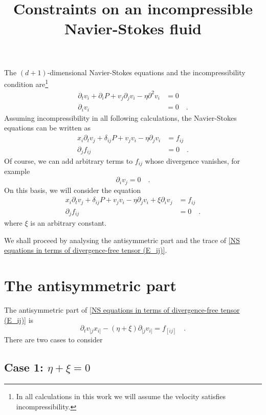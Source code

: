 \documentclass[10pt,a4paper]{article}
\title{Constraints on an incompressible Navier-Stokes fluid}
\date{}
\begin{document}
\maketitle

The $(d+1)$-dimensional Navier-Stokes equations and the incompressibility condition are\footnote{In all calculations in this work we will assume the velocity satisfies incompressibility.}
\begin{align}
	\partial_t v_i + \partial_i P + v_j\partial_j v_i - \eta \partial^2 v_i & = 0
\\	\partial_i v_i & = 0		\quad.
\end{align}
Assuming incompressibility in all following calculations, the Navier-Stokes equations can be written as
\begin{align}
	x_i \partial_t v_j + \delta_{ij} P + v_j v_i - \eta \partial_j v_i & = f_{ij}
\\	\partial_j f_{ij} & = 0\quad.
\end{align}
Of course, we can add arbitrary terms to $f_{ij}$ whose divergence vanishes, for example
\begin{equation}
	\partial_i v_j = 0		\quad.
\end{equation}
On this basis, we will consider the equation
\begin{align}
	x_i \partial_t v_j + \delta_{ij} P + v_j v_i - \eta \partial_j v_i + \xi \partial_i v_j & = f_{ij}		\label{NS equations in terms of divergence-free tensor (E_ij)}
\\	\partial_j f_{ij} & = 0\quad.
\end{align}
where $\xi$ is an arbitrary constant.

We shall proceed by analysing the antisymmetric part and the trace of \eqref{NS equations in terms of divergence-free tensor (E_ij)}.

\section{The antisymmetric part}

The antisymmetric part of \eqref{NS equations in terms of divergence-free tensor (E_ij)} is
\begin{equation}
\partial_t v_{[j} x_{i]} - (\eta + \xi) \partial_{[j} v_{i]} = f_{[ij]}		\quad.
\label{antisymmetric part of NS}
\end{equation}
There are two cases to consider

\subsection{Case 1: $\eta + \xi = 0$}
\end{document}
